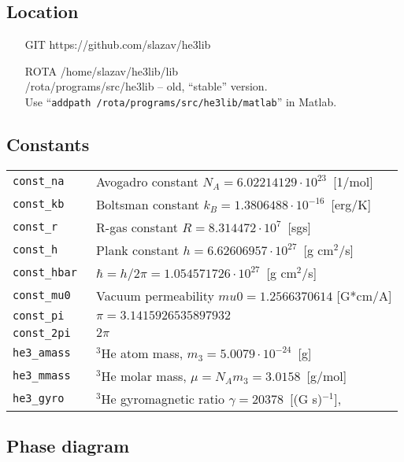 \documentclass[a4paper]{article}
\begin{document}
\subsection*{Location}
\begin{itemize}
\item[GIT]  https://github.com/slazav/he3lib
\item[ROTA]
/home/slazav/he3lib/lib\\
/rota/programs/src/he3lib -- old, ``stable'' version.\\
Use ``{\tt addpath /rota/programs/src/he3lib/matlab}'' in Matlab.
\end{itemize}


\subsection*{Constants}

\medskip
\noindent\begin{tabular}{lp{11cm}}
\tt const\_na      & Avogadro constant $N_A = 6.02214129 \cdot 10^{23}$~[1/mol]\\
\tt const\_kb      & Boltsman constant $k_B = 1.3806488 \cdot 10^{-16}$~[erg/K]\\
\tt const\_r       & R-gas constant $R = 8.314472 \cdot 10^{7}$~[sgs]\\
\tt const\_h       & Plank constant $h = 6.62606957 \cdot 10^{27}$~[g cm$^2$/s]\\
\tt const\_hbar    & $\hbar = h/2\pi = 1.054571726 \cdot 10^{27}$~[g cm$^2$/s]\\
\tt const\_mu0     & Vacuum permeability $mu0 = 1.2566370614$ [G*cm/A]\\
\tt const\_pi      & $\pi = 3.1415926535897932$\\
\tt const\_2pi     & $2\pi$\\
\tt he3\_amass     & $^3$He atom mass, $m_3 = 5.0079 \cdot 10^{-24}$~[g]\\
\tt he3\_mmass     & $^3$He molar mass, $\mu = N_A m_3 = 3.0158$~[g/mol]\\
\tt he3\_gyro      & $^3$He gyromagnetic ratio $\gamma = 20378$~[(G s)$^{-1}$],\\
\end{tabular}
\medskip

\eject
\subsection*{Phase diagram}
\end{document}

